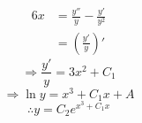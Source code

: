 \item

\begin{align*}
	6x
	 & = \frac{y''}{y} - \frac{y'}{y^2} \\
	 & = \left( \frac{y'}{y} \right)'
\end{align*}
\[
	\Rightarrow \frac{y'}{y} = 3x^2 + C_1
\]
\[
	\Rightarrow \ln y = x^3 + C_1 x + A
\]
\[
	\therefore y = C_2 e^{x^3 + C_1 x}
\]